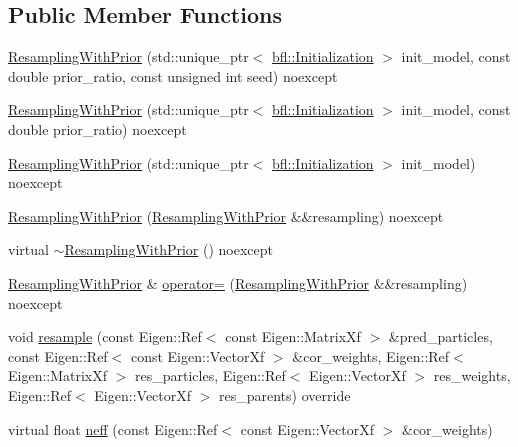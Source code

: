 \subsection*{Public Member Functions}
\begin{DoxyCompactItemize}
\item 
\mbox{\hyperlink{classbfl_1_1ResamplingWithPrior_a48293e554e60451e5d455ad1a13dda44}{Resampling\+With\+Prior}} (std\+::unique\+\_\+ptr$<$ \mbox{\hyperlink{classbfl_1_1Initialization}{bfl\+::\+Initialization}} $>$ init\+\_\+model, const double prior\+\_\+ratio, const unsigned int seed) noexcept
\item 
\mbox{\hyperlink{classbfl_1_1ResamplingWithPrior_a82ab650342bfcf94a302072827994db9}{Resampling\+With\+Prior}} (std\+::unique\+\_\+ptr$<$ \mbox{\hyperlink{classbfl_1_1Initialization}{bfl\+::\+Initialization}} $>$ init\+\_\+model, const double prior\+\_\+ratio) noexcept
\item 
\mbox{\hyperlink{classbfl_1_1ResamplingWithPrior_a768d0bf1834f48d067a230b9554cb8cb}{Resampling\+With\+Prior}} (std\+::unique\+\_\+ptr$<$ \mbox{\hyperlink{classbfl_1_1Initialization}{bfl\+::\+Initialization}} $>$ init\+\_\+model) noexcept
\item 
\mbox{\hyperlink{classbfl_1_1ResamplingWithPrior_a8b813e6d3d80b914d06fdc60e46c3a53}{Resampling\+With\+Prior}} (\mbox{\hyperlink{classbfl_1_1ResamplingWithPrior}{Resampling\+With\+Prior}} \&\&resampling) noexcept
\item 
virtual \mbox{\hyperlink{classbfl_1_1ResamplingWithPrior_a686fa89037df955d6e657f2364644462}{$\sim$\+Resampling\+With\+Prior}} () noexcept
\item 
\mbox{\hyperlink{classbfl_1_1ResamplingWithPrior}{Resampling\+With\+Prior}} \& \mbox{\hyperlink{classbfl_1_1ResamplingWithPrior_a79ed56028dc2f97f0fb400a481998010}{operator=}} (\mbox{\hyperlink{classbfl_1_1ResamplingWithPrior}{Resampling\+With\+Prior}} \&\&resampling) noexcept
\item 
void \mbox{\hyperlink{classbfl_1_1ResamplingWithPrior_a440090305ac024e1f5ad06fd36cccd34}{resample}} (const Eigen\+::\+Ref$<$ const Eigen\+::\+Matrix\+Xf $>$ \&pred\+\_\+particles, const Eigen\+::\+Ref$<$ const Eigen\+::\+Vector\+Xf $>$ \&cor\+\_\+weights, Eigen\+::\+Ref$<$ Eigen\+::\+Matrix\+Xf $>$ res\+\_\+particles, Eigen\+::\+Ref$<$ Eigen\+::\+Vector\+Xf $>$ res\+\_\+weights, Eigen\+::\+Ref$<$ Eigen\+::\+Vector\+Xf $>$ res\+\_\+parents) override
\item 
virtual float \mbox{\hyperlink{classbfl_1_1Resampling_aacbdbcf3f6c8620785ed6446928cd1f1}{neff}} (const Eigen\+::\+Ref$<$ const Eigen\+::\+Vector\+Xf $>$ \&cor\+\_\+weights)
\end{DoxyCompactItemize}

